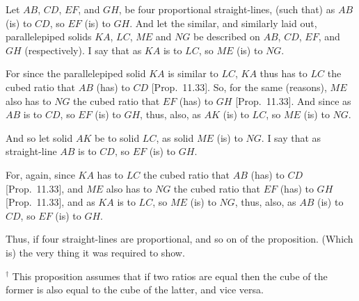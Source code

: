 \begin{Parallel}{}{}
{\epsfysize=1.9in
\centerline{}

Let $AB$, $CD$, $EF$, and $GH$, be four proportional
straight-lines, (such that) as $AB$ (is) to $CD$, so $EF$ (is) to $GH$. 
And let the similar, and similarly laid out, parallelepiped solids $KA$,
$LC$, $ME$ and $NG$ be described on $AB$, $CD$,
$EF$, and $GH$ (respectively). I say that as $KA$ is to $LC$, so
$ME$ (is) to $NG$.

For since the parallelepiped solid $KA$ is similar to $LC$, $KA$
thus has to $LC$ the cubed ratio that $AB$ (has) to $CD$ [Prop.~11.33]. So, for the same (reasons), $ME$ also has to
$NG$ the cubed ratio that $EF$ (has) to $GH$ [Prop.~11.33]. And since as $AB$
is to $CD$, so $EF$ (is) to $GH$, thus, also,  as $AK$ (is) to
$LC$, so $ME$ (is) to $NG$.

And so let solid $AK$ be to solid $LC$, as solid $ME$ (is) to $NG$.
I say that as straight-line $AB$ is to $CD$, so $EF$ (is) to $GH$.

For, again, since $KA$ has to $LC$ the cubed ratio that
$AB$ (has) to $CD$ [Prop.~11.33], and $ME$ also has to $NG$ the cubed ratio
that $EF$ (has) to $GH$ [Prop.~11.33], and as $KA$ is to $LC$, so $ME$
(is) to $NG$, thus, also, as $AB$ (is) to $CD$, so $EF$ (is) to $GH$.

Thus, if four straight-lines are proportional, and so on of
the proposition. (Which is) the very thing it was required to show.}
\end{Parallel}
{\footnotesize\noindent$^\dag$ This proposition assumes that if two
ratios are equal then the cube of the former is also equal to the cube of the
latter, and {\rm  vice versa}.}

